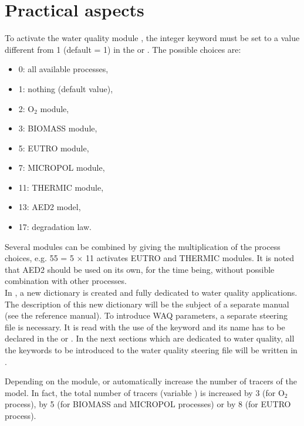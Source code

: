 \chapter{Practical aspects}

To activate the water quality module \waqtel, the integer keyword
 must be set to a value different from 1 (default = 1)
in the  or  .
The possible choices are:
\begin{itemize}
\item 0: all available processes,
\item 1: nothing (default value),
\item 2: O$_2$ module,
\item 3: BIOMASS module,
\item 5: EUTRO module,
\item 7: MICROPOL module,
\item 11: THERMIC module,
\item 13: AED2 model,
\item 17: degradation law.
\end{itemize}

Several modules can be combined by giving the multiplication of the process choices,
e.g. 55 = 5 $\times$ 11 activates EUTRO and THERMIC modules.
It is noted that AED2 should be used on its own, for the time being,
without possible combination with other processes.\\

In \waqtel, a new dictionary is created and fully dedicated to water quality applications.
The description of this new dictionary will be the subject of a separate manual
(see the \waqtel reference manual).
To introduce WAQ parameters, a separate steering file is necessary.
It is read with the use of the keyword 
and its name has to be declared in the  or 
.
In the next sections which are dedicated to water quality,
all the keywords to be introduced to the water quality steering file
will be written in .

Depending on the \waqtel module,  or 
automatically increase the number of tracers of the model.
In fact, the total number of tracers (variable )
is increased by 3 (for O$_2$ process), by 5 (for BIOMASS and MICROPOL processes)
or by 8 (for EUTRO process).

